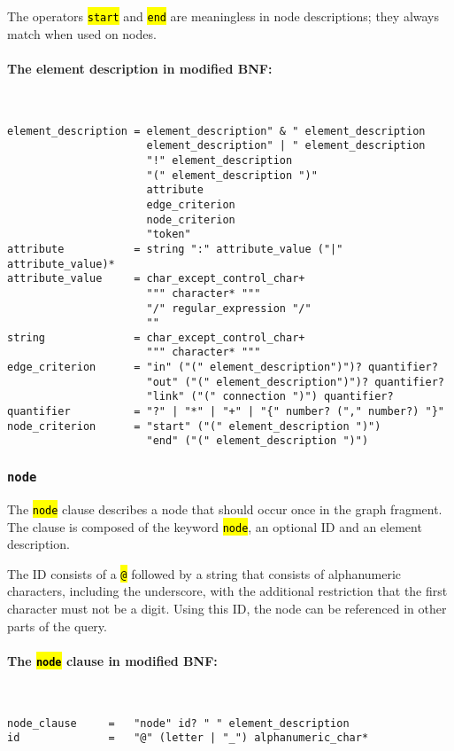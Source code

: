 \documentclass[12pt]{scrartcl}
\newcommand{\code}[1]{\hl{\texttt{#1}}}
\begin{document}
The operators \code{start} and \code{end} are meaningless in node descriptions; they always match when used on nodes.

\paragraph*{The element description in modified BNF:}
~
\begin{lstlisting}
element_description = element_description" & " element_description
                      element_description" | " element_description
                      "!" element_description
                      "(" element_description ")"
                      attribute
                      edge_criterion
                      node_criterion
                      "token"
attribute           = string ":" attribute_value ("|" attribute_value)*
attribute_value     = char_except_control_char+
                      """ character* """
                      "/" regular_expression "/"
                      ""
string              = char_except_control_char+
                      """ character* """
edge_criterion      = "in" ("(" element_description")")? quantifier?
                      "out" ("(" element_description")")? quantifier?
                      "link" ("(" connection ")") quantifier?
quantifier          = "?" | "*" | "+" | "{" number? ("," number?) "}"
node_criterion      = "start" ("(" element_description ")")
                      "end" ("(" element_description ")")
\end{lstlisting}


\subsubsection{\texttt{node}}\label{node}

The \code{node} clause describes a node that should occur once in the graph fragment.
The clause is composed of the keyword \code{node}, an optional ID and an element description.

The ID consists of a \code{@} followed by a string that consists of alphanumeric characters, including the underscore, with the additional restriction that the first character must not be a digit.
Using this ID, the node can be referenced in other parts of the query.

\paragraph*{The \code{node} clause in modified BNF:}
~
\begin{lstlisting}
node_clause     =   "node" id? " " element_description
id              =   "@" (letter | "_") alphanumeric_char*
\end{lstlisting}
\end{document}
